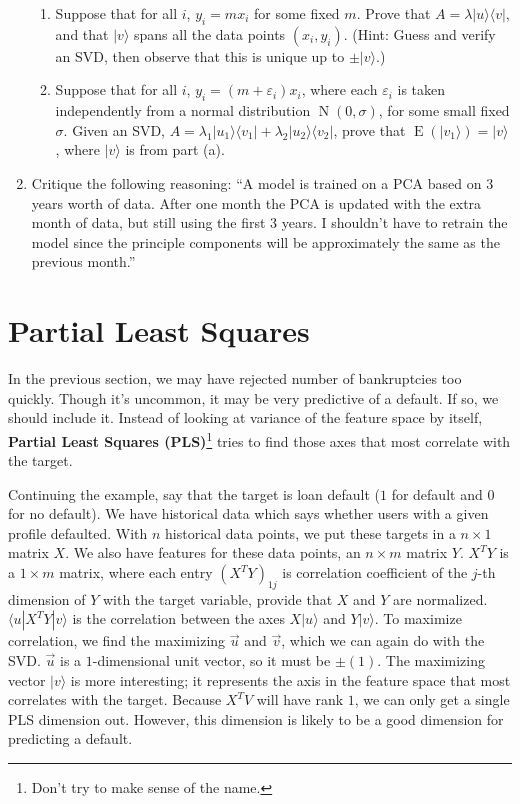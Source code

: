 \documentclass{amsbook}
\begin{document}
\begin{enumerate}
\begin{enumerate}
\item Suppose that for all $i$, $y_i=mx_i$ for some fixed $m$.  Prove that $A=\lambda|u\rangle\langle v|$, and that $|v\rangle$ spans all the data points $(x_i, y_i)$.  (Hint: Guess and verify an SVD, then observe that this is unique up to $\pm |v\rangle$.)
\item Suppose that for all $i$, $y_i=(m+\varepsilon_i)x_i$, where each $\varepsilon_i$ is taken independently from a normal distribution $\operatorname{N}(0, \sigma)$, for some small fixed $\sigma$.  Given an SVD, $A=\lambda_1|u_1\rangle\langle v_1|+\lambda_2|u_2\rangle\langle v_2|$, prove that $\operatorname{E}\left(|v_1\rangle\right)=|v\rangle$, where $|v\rangle$ is from part (a).
\end{enumerate}
\item Critique the following reasoning:  “A model is trained on a PCA based on 3 years worth of data.  After one month the PCA is updated with the extra month of data, but still using the first 3 years.  I shouldn’t have to retrain the model since the principle components will be approximately the same as the previous month.”
\end{enumerate}

\section{Partial Least Squares}

In the previous section, we may have rejected number of bankruptcies too quickly.  Though it's uncommon, it may be very predictive of a default.  If so, we should include it.  Instead of looking at variance of the feature space by itself, {\bf Partial Least Squares (PLS)}\footnote{Don't try to make sense of the name.} tries to find those axes that most correlate with the target.

Continuing the example, say that the target is loan default ($1$ for default and $0$ for no default).  We have historical data which says whether users with a given profile defaulted.  With $n$ historical data points, we put these targets in a $n\times 1$ matrix $X$.  We also have features for these data points, an $n\times m$ matrix $Y$.  $X^TY$ is a $1\times m$ matrix, where each entry $(X^TY)_{1j}$ is correlation coefficient of the $j$-th dimension of $Y$ with the target variable, provide that $X$ and $Y$ are normalized.  $\langle u|X^TY|v\rangle$ is the correlation between the axes $X|u\rangle$ and $Y|v\rangle$.  To maximize correlation, we find the maximizing $\vec u$ and $\vec v$, which we can again do with the SVD.  $\vec u$ is a $1$-dimensional unit vector, so it must be $\pm (1)$.  The maximizing vector $|v\rangle$ is more interesting; it represents the axis in the feature space that most correlates with the target.  Because $X^TV$ will have rank $1$, we can only get a single PLS dimension out.  However, this dimension is likely to be a good dimension for predicting a default.
\end{document}
